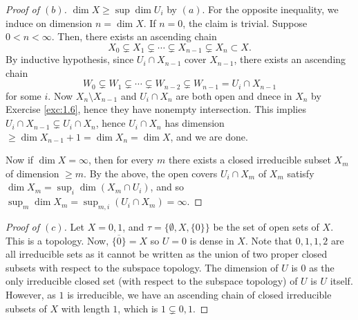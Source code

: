 \documentclass[12pt,letterpaper]{article}
\theoremstyle{definition}
\theoremstyle{remark}
\numberwithin{equation}{section}
\numberwithin{figure}{problem}
\begin{document}
\begin{proof}[Proof of $(b)$]
  $\dim X \ge \sup \dim U_i$ by $(a)$.
  For the opposite inequality, we induce on dimension $n = \dim X$.
  If $n = 0$, the claim is trivial.
  Suppose $0 < n < \infty$. Then, there exists an ascending chain
  \begin{equation*}
    X_0 \subsetneq X_1 \subsetneq\cdots \subsetneq X_{n-1} \subsetneq X_n
    \subset X.
  \end{equation*}
  By inductive hypothesis, since $U_i \cap X_{n-1}$ cover $X_{n-1}$, there
  exists an ascending chain
  \begin{equation*}
    W_0 \subsetneq W_1 \subsetneq \cdots \subsetneq W_{n-2} \subsetneq W_{n-1}
    = U_i \cap X_{n-1}
  \end{equation*}
  for some $i$. Now $X_n \setminus X_{n-1}$ and $U_i \cap X_n$ are both open and
  dnece in $X_n$ by Exercise \ref{exc:1.6}, hence they have nonempty
  intersection.
  This implies $U_i \cap X_{n-1} \subsetneq U_i \cap X_n$, hence $U_i \cap X_n$
  has dimension $\ge \dim X_{n-1} + 1 = \dim X_n = \dim X$, and we are done.
  \par Now if $\dim X = \infty$, then for every $m$ there exists a closed
  irreducible subset $X_m$ of dimension $\ge m$. By the above, the open covers $U_i
  \cap X_m$ of $X_m$ satisfy $\dim X_m = \sup_i\dim (X_m \cap U_i)$, and so
  $\sup_m \dim X_m = \sup_{m,i}(U_i \cap X_m) = \infty$.
\end{proof}
\begin{proof}[Proof of $(c)$]
	Let $X = {0,1}$, and $\tau = \{ \emptyset, X, \{0\}\}$ be the set of open sets of $X$. This is a topology. 
	Now, $\overline{\{0\}} = X$ so $U = {0}$ is dense in $X$. Note that ${0},{1}, {1,2}$ are all irreducible sets as it cannot be written as the union of two proper closed subsets with respect to the subspace topology.
	The dimension of $U$ is 0 as the only irreducible closed set (with respect to the subspace topology) of $U$ is $U$ itself. However, as ${1}$ is irreducible, we have an ascending chain of closed irreducible subsets of $X$ with length $1$, which is ${1} \subsetneq {0,1}$.  
\end{proof}
\end{document}
